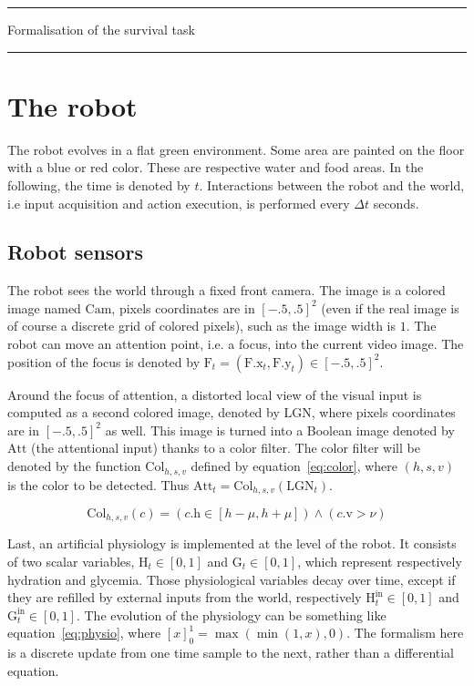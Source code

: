 \documentclass[10pt,a4paper]{article}
\newcommand{\Et}[0]{\wedge}
\newcommand{\Fx}     [2]{{#1} \left( #2                 \right)}
\newcommand{\Diff}[1]{{\Delta #1}}
\newcommand{\AttrOf}[2]{{#1}.\mathrm{#2}}
\newcommand{\Xof}[1]{\AttrOf{#1}x}
\newcommand{\Yof}[1]{\AttrOf{#1}y}
\newcommand{\Group}[1]{{\left({#1}\right)}}
\newcommand{\Pair}[2]{\left({#1},{#2}\right)}
\newcommand{\At}[2]{#1_{#2}}
\newcommand{\AtT}[1]{\At{#1}t}
\newcommand{\Sat}[1]{{\left[{#1}\right]}^1_0}
\newcommand{\CamIn}[0]{\mathrm{Cam}}
\newcommand{\LgnIn}[0]{\mathrm{LGN}}
\newcommand{\Attent}[0]{\mathrm{Att}}
\newcommand{\Focus}[0]{\mathrm{F}}
\newcommand{\Color}[3]{\mathrm{Col}_{#1,#2,#3}}
\newcommand{\Hydro}[0]{\mathrm{H}}
\newcommand{\Glyco}[0]{\mathrm{G}}
\newcommand{\HIngest}[0]{\Hydro^{\mathrm{in}}}
\newcommand{\GIngest}[0]{\Glyco^{\mathrm{in}}}
\newcommand{\Htol}[0]{\mu}
\newcommand{\Vmin}[0]{\nu}
\begin{document}
\hrule
\vspace{10mm}
\centerline{\LARGE Formalisation of the survival task}
\vspace{10mm}
\hrule
\vspace{10mm}

\tableofcontents

\section{The robot}

The robot evolves in a flat green environment. Some area are painted on the floor with a blue or red color. These are respective water and food areas. In the following, the time is denoted by $t$. Interactions between the robot and the world, i.e input acquisition and action execution, is performed every $\Diff t$ seconds. 

\subsection{Robot sensors}

The robot sees the world through a fixed front camera. The image is a colored image named $\CamIn$, pixels coordinates are in $[-.5,.5]^2$ (even if the real image is of course a discrete grid of colored pixels), such as the image width is $1$. The robot can move an attention point, i.e. a focus, into the current video image. The position of the focus is denoted by $\AtT\Focus = \Pair{\AtT{\Xof\Focus}}{\AtT{\Yof\Focus}} \in [-.5,.5]^2$.

Around the focus of attention, a distorted local view of the visual input is computed as a second colored image, denoted by $\LgnIn$, where pixels coordinates are in $[-.5,.5]^2$ as well. This image is turned into a Boolean image denoted by $\Attent$ (the attentional input) thanks to a color filter. The color filter will be denoted by the function $\Color hsv$ defined by equation~\ref{eq:color}, where $\Group{h,s,v}$ is the color to be detected. Thus $\AtT\Attent = \Fx {\Color hsv}{\AtT\LgnIn}$.

\begin{equation}
\Fx {\Color hsv}{c} = \Group{\AttrOf ch \in [h-\Htol,h+\Htol]} \Et \Group{\AttrOf cv > \Vmin \label{eq:color}}
\end{equation}

Last, an artificial physiology is implemented at the level of the robot. It consists of two scalar variables, $\AtT\Hydro \in [0,1]$ and $\AtT\Glyco \in [0,1]$, which represent respectively hydration and glycemia. Those physiological variables decay over time, except if they are refilled by external inputs from the world, respectively $\AtT\HIngest \in [0,1]$ and $\AtT\GIngest \in [0,1]$. The evolution of the physiology can be something like equation~\ref{eq:physio}, where $\Sat x = \max(\min(1,x),0)$. The formalism here is a discrete update from one time sample to the next, rather than a differential equation.
\end{document}
